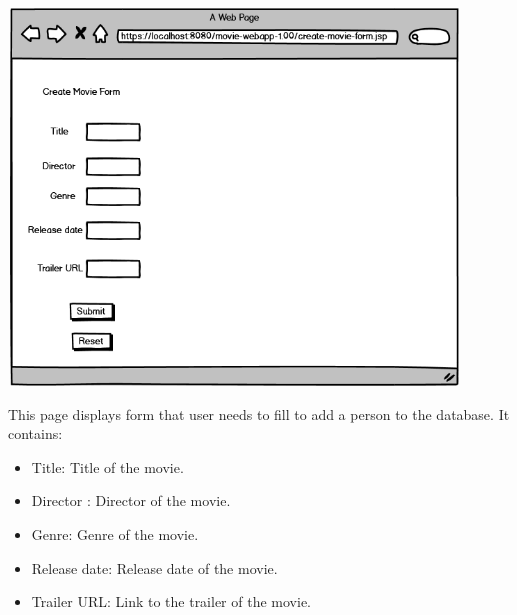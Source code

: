\begin{center}
\includegraphics[width=12cm, height=10cm]{pictures/Create Movie Form.png}
\end{center}

This page displays form that user needs to fill to add a person to the database. It contains:
\begin{itemize}
\item Title: Title of the movie.
\item Director : Director of the movie.
\item  Genre: Genre of the movie.
\item  Release date: Release date of the movie.
\item  Trailer URL: Link to the trailer of the movie.
\end{itemize}
